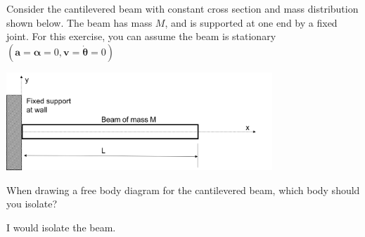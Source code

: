 Consider the cantilevered beam with constant cross section and mass distribution shown below. The beam has mass $M$, and is supported at one end by a fixed joint. For this exercise, you can assume the beam is stationary $(\boldsymbol{a}=\boldsymbol{\alpha}=0, \boldsymbol{v}=\boldsymbol{\dot{\theta}}=0)$

\begin{center}
    \includegraphics[width=0.75\textwidth]{img/fig24_3.png}
\end{center}

When drawing a free body diagram for the cantilevered beam, which body should you isolate?

\begin{solution}
    I would isolate the beam.
\end{solution}
